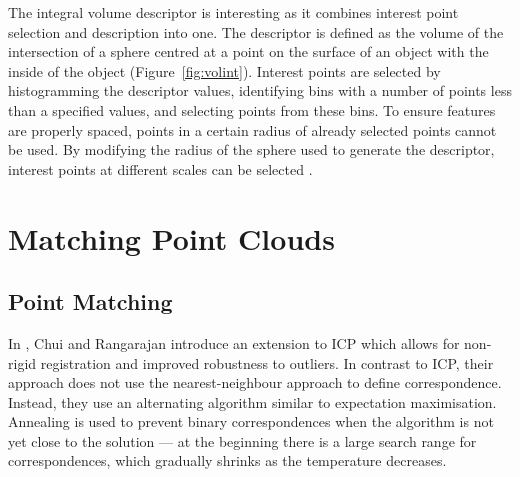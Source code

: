 \documentclass[11pt,a4paper]{kth-mag}
\begin{document}
The integral volume descriptor is interesting as it combines interest point
selection and description into one. The descriptor is defined as the volume of
the intersection of a sphere centred at a point on the surface of an object with
the inside of the object (Figure~\ref{fig:volint}). Interest points are selected
by histogramming the descriptor values, identifying bins with a number of points
less than a specified values, and selecting points from these bins. To ensure
features are properly spaced, points in a certain radius of already selected
points cannot be used. By modifying the radius of the sphere used to generate
the descriptor, interest points at different scales can be selected
\cite{gelfand2005robust}.

\section{Matching Point Clouds}
\subsection{Point Matching}
In \cite{chui2003new}, Chui and Rangarajan introduce an extension to ICP which
allows for non-rigid registration and improved robustness to outliers. In
contrast to ICP, their approach does not use the nearest-neighbour approach to
define correspondence. Instead, they use an alternating algorithm similar to
expectation maximisation. Annealing is used to prevent binary correspondences
when the algorithm is not yet close to the solution --- at the beginning there
is a large search range for correspondences, which gradually shrinks as the
temperature decreases.
\end{document}

